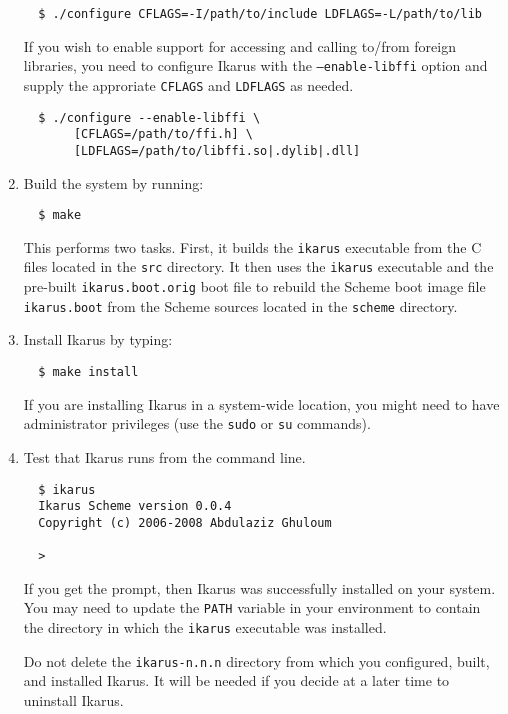 \documentclass[onecolumn, 12pt, twoside, openright, dvipdfm]{book}
\begin{document}
\begin{enumerate}
\begin{verbatim}
  $ ./configure CFLAGS=-I/path/to/include LDFLAGS=-L/path/to/lib
\end{verbatim}


If you wish to enable support for accessing and calling to/from
foreign libraries, you need to configure Ikarus with the
\texttt{--enable-libffi} option and supply the approriate
\texttt{CFLAGS} and \texttt{LDFLAGS} as needed.

\begin{verbatim}
  $ ./configure --enable-libffi \
       [CFLAGS=/path/to/ffi.h] \
       [LDFLAGS=/path/to/libffi.so|.dylib|.dll]
\end{verbatim}



\item Build the system by running:
\begin{verbatim}
  $ make
\end{verbatim}
This performs two
tasks.  First, it builds the \texttt{ikarus} executable from the C
files located in the \texttt{src} directory.  It then uses the
\texttt{ikarus} executable and the pre-built
\texttt{ikarus.boot.orig} boot file to rebuild the Scheme boot image
file \texttt{ikarus.boot} from the Scheme sources located in the
\texttt{scheme} directory.

\item Install Ikarus by typing:
\begin{verbatim}
  $ make install
\end{verbatim}
If you are installing Ikarus in a system-wide location, you might
need to have administrator privileges (use the \texttt{sudo} or
\texttt{su} commands).

\item Test that Ikarus runs from the command line.
\begin{verbatim}
  $ ikarus
  Ikarus Scheme version 0.0.4
  Copyright (c) 2006-2008 Abdulaziz Ghuloum

  > 
\end{verbatim}
If you get the prompt, then Ikarus was successfully installed on
your system.  You may need to update the \texttt{PATH} variable in
your environment to contain the directory in which the
\texttt{ikarus} executable was installed.

Do not delete the \texttt{ikarus-n.n.n} directory from which you
configured, built, and installed Ikarus.  It will be needed if you
decide at a later time to uninstall Ikarus.

\end{enumerate}
\end{document}
